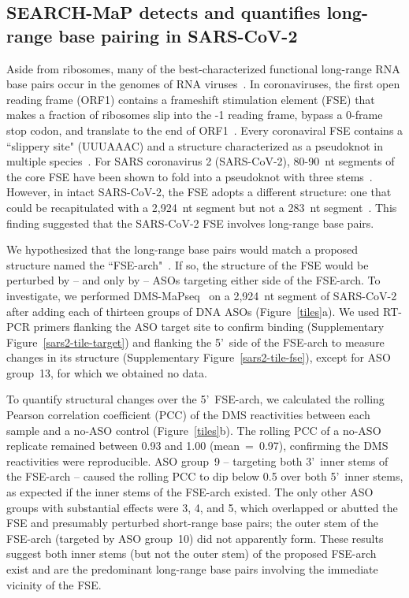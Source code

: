 \documentclass[main.tex]{subfiles}
\begin{document}
\subsection{SEARCH-MaP detects and quantifies long-range base pairing in SARS-CoV-2}

Aside from ribosomes, many of the best-characterized functional long-range RNA base pairs occur in the genomes of RNA viruses~\cite{Nicholson2014}.
In coronaviruses, the first open reading frame (ORF1) contains a frameshift stimulation element (FSE) that makes a fraction of ribosomes slip into the -1 reading frame, bypass a 0-frame stop codon, and translate to the end of ORF1~\cite{Plant2008}.
Every coronaviral FSE contains a ``slippery site" (UUUAAAC) and a structure characterized as a pseudoknot in multiple species~\cite{Brierley1989,Herald1993,Plant2005b}.
For SARS coronavirus 2 (SARS-CoV-2), 80-90~nt segments of the core FSE have been shown to fold into a pseudoknot with three stems~\cite{KZhang2021,Roman2021,Jones2022}.
However, in intact SARS-CoV-2, the FSE adopts a different structure: one that could be recapitulated with a 2,924~nt segment but not a 283~nt segment~\cite{Lan2022}.
This finding suggested that the SARS-CoV-2 FSE involves long-range base pairs.

We hypothesized that the long-range base pairs would match a proposed structure named the ``FSE-arch"~\cite{Ziv2020}.
If so, the structure of the FSE would be perturbed by -- and only by -- ASOs targeting either side of the FSE-arch.
To investigate, we performed DMS-MaPseq~\cite{Zubradt2016} on a 2,924~nt segment of SARS-CoV-2 after adding each of thirteen groups of DNA ASOs (Figure~\ref{tiles}a).
We used RT-PCR primers flanking the ASO target site to confirm binding (Supplementary Figure~\ref{sars2-tile-target}) and flanking the 5'~side of the FSE-arch to measure changes in its structure (Supplementary Figure~\ref{sars2-tile-fse}), except for ASO group~13, for which we obtained no data.

To quantify structural changes over the 5'~FSE-arch, we calculated the rolling Pearson correlation coefficient (PCC) of the DMS reactivities between each sample and a no-ASO control (Figure~\ref{tiles}b).
The rolling PCC of a no-ASO replicate remained between 0.93 and 1.00 (mean~=~0.97), confirming the DMS reactivities were reproducible.
ASO group~9 -- targeting both 3'~inner stems of the FSE-arch -- caused the rolling PCC to dip below 0.5 over both 5'~inner stems, as expected if the inner stems of the FSE-arch existed.
The only other ASO groups with substantial effects were 3, 4, and 5, which overlapped or abutted the FSE and presumably perturbed short-range base pairs; the outer stem of the FSE-arch (targeted by ASO group~10) did not apparently form.
These results suggest both inner stems (but not the outer stem) of the proposed FSE-arch~\cite{Ziv2020} exist and are the predominant long-range base pairs involving the immediate vicinity of the FSE.
\end{document}

